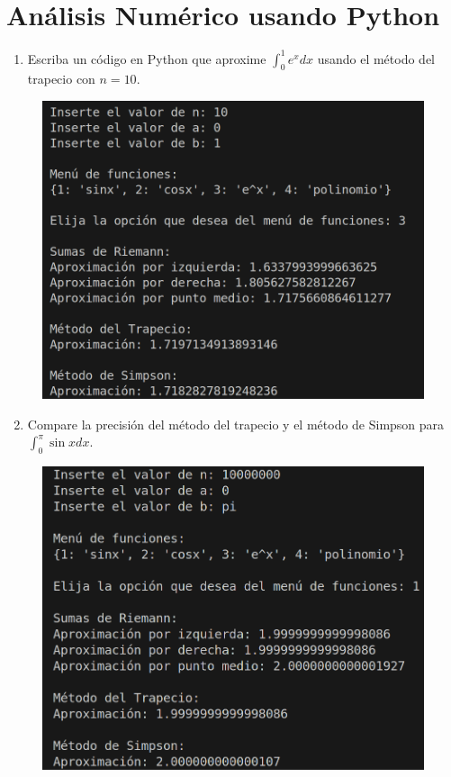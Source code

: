 \section{Análisis Numérico usando Python}

\begin{enumerate}
    \item Escriba un código en Python que aproxime \( \int_{0}^{1} e^x dx \) usando el método del trapecio con \( n = 10 \).
\end{enumerate}

\begin{figure}[H]
    \centering
    \includegraphics[scale=0.25]{images/python1.png}
    \label{fig:integralEx}
\end{figure}


\begin{enumerate}
    \setcounter{enumi}{1}
    \item Compare la precisión del método del trapecio y el método de Simpson para \( \int_{0}^{\pi} \sin x dx \).
\end{enumerate}

\begin{figure}[H]
    \centering
    \includegraphics[scale=0.25]{images/python2.png}
    \label{fig:integralSeno}
\end{figure}

